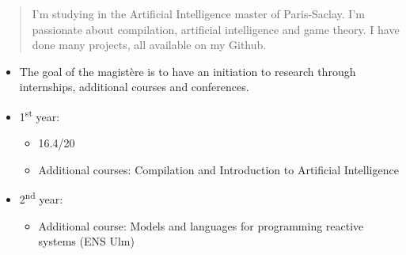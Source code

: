 \documentclass[10pt,a4paper,ragged2e,withhyper]{altacv}
\begin{document}
\begin{paracol}{2}
        
        
        \newpage
        
        \switchcolumn
        
            \begin{quote}
              I'm studying in the Artificial Intelligence master of Paris-Saclay. I'm passionate about compilation, artificial intelligence and game theory.
              I have done many projects, all available on my Github.
            \end{quote}
        
        
            \divider

            \begin{itemize}
              \item The goal of the magistère is to have an initiation to research through internships, additional courses and conferences.
              \item 1\textsuperscript{st} year:
                    \begin{itemize}
                      \item 16.4/20
                      \item Additional courses: Compilation and Introduction to Artificial Intelligence
                    \end{itemize}
              \item 2\textsuperscript{nd} year:
                    \begin{itemize}
                      \item Additional course: Models and languages for programming reactive systems (ENS Ulm)
                    \end{itemize}
            \end{itemize}
            \divider


\end{paracol}
\end{document}

